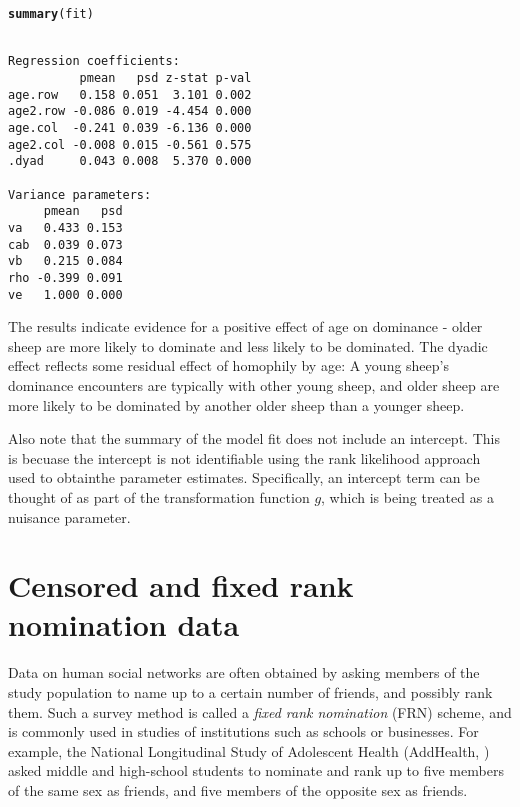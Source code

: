 \documentclass[11pt]{article}\usepackage[]{graphicx}\usepackage[]{color}
\makeatletter
\newcommand{\hlstd}[1]{\textcolor[rgb]{0.345,0.345,0.345}{#1}}%
\newcommand{\hlkwd}[1]{\textcolor[rgb]{0.737,0.353,0.396}{\textbf{#1}}}%
\newenvironment{kframe}{%
 \def\at@end@of@kframe{}%
 \ifinner\ifhmode%
  \def\at@end@of@kframe{\end{minipage}}%
  \begin{minipage}{\columnwidth}%
 \fi\fi%
 \def\FrameCommand##1{\hskip\@totalleftmargin \hskip-\fboxsep
 \colorbox{shadecolor}{##1}\hskip-\fboxsep
     \hskip-\linewidth \hskip-\@totalleftmargin \hskip\columnwidth}%
 \MakeFramed {\advance\hsize-\width
   \@totalleftmargin\z@ \linewidth\hsize
   \@setminipage}}%
 {\par\unskip\endMakeFramed%
 \at@end@of@kframe}
\newenvironment{knitrout}{}{} %
\makeatother
\begin{document}
\begin{knitrout}\footnotesize
{}\color{fgcolor}\begin{kframe}
\begin{alltt}
\hlkwd{summary}\hlstd{(fit)}
\end{alltt}
\begin{verbatim}

Regression coefficients:
          pmean   psd z-stat p-val
age.row   0.158 0.051  3.101 0.002
age2.row -0.086 0.019 -4.454 0.000
age.col  -0.241 0.039 -6.136 0.000
age2.col -0.008 0.015 -0.561 0.575
.dyad     0.043 0.008  5.370 0.000

Variance parameters:
     pmean   psd
va   0.433 0.153
cab  0.039 0.073
vb   0.215 0.084
rho -0.399 0.091
ve   1.000 0.000
\end{verbatim}
\end{kframe}
\end{knitrout}
The results indicate evidence for a positive effect 
of age on dominance - older sheep are more likely 
to dominate and less likely to be dominated. 
The dyadic effect reflects some residual effect of homophily 
by age: A young sheep's dominance encounters are typically 
with other young sheep, and older sheep are more likely to 
be dominated by another older sheep than a younger sheep. 

Also note that the summary of the model fit does not include an intercept. 
This is becuase the intercept is not identifiable using the rank likelihood
approach used to obtainthe parameter estimates. Specifically, 
an intercept term can be thought of as part of the transformation 
function $g$, which is being treated as a nuisance parameter. 


\section{Censored and fixed rank nomination data}
Data on human social networks are often  
obtained by asking 
members of the study population to name up to a certain number 
of friends, and possibly rank them. 
Such a survey method is called a \emph{fixed rank nomination} (FRN) 
scheme, and is commonly used in studies of institutions such as 
schools or businesses. For example, 
the National Longitudinal Study of Adolescent Health (AddHealth,
\citet{harris_2009}) asked middle and high-school students to nominate and 
rank up to five members of the same sex as friends, and five members 
of the opposite sex as friends. 
\end{document}
